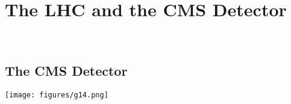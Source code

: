 \chapter{The LHC and the CMS Detector}~\label{sec:cms}
\noindent
\section{The CMS Detector}
\lipsum[10]

\begin{landscape}
\begin{SCfigure}%
    \centering
    \texttt{[image: figures/g14.png]}
    \label{fig:cms}
\end{SCfigure}
\end{landscape}
